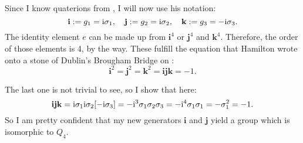 \documentclass[11pt, english, fleqn, DIV=15, headinclude, BCOR=1cm]{scrartcl}
\begin{document}
\newcommand\qi{\mathbf i}
\newcommand\qj{\mathbf j}
\newcommand\qk{\mathbf k}

Since I know quaterions from \parencite[§11.1]{penrose-road_to_reality}, I will
now use his notation:
\[
    \qi := g_1 = \iup\1
    \eqnsep
    \qj := g_2 = \iup\2
    \eqnsep
    \qk := g_3 = -\iup\3.
\]
The identity element $e$ can be made up from $\qi^4$ or $\qj^4$ and $\qk^4$.
Therefore, the order of those elements is 4, by the way. These fulfill the
equation that Hamilton wrote onto a stone of Dublin's Brougham Bridge on
 \parencite[198]{penrose-road_to_reality}:
\[
    \qi^2 = \qj^2 = \qk^2 = \qi\qj\qk = -1.
\]

The last one is not trivial to see, so I show that here:
\[
    \qi\qj\qk = \iup\1 \iup\2 [-\iup\3] = - \iup^3 \1\2\3 = - \iup^4 \1\1
    = - \1^2 = -1.
\]
So I am pretty confident that my new generators $\qi$ and $\qj$ yield a group
which is isomorphic to $Q_4$.
\end{document}

